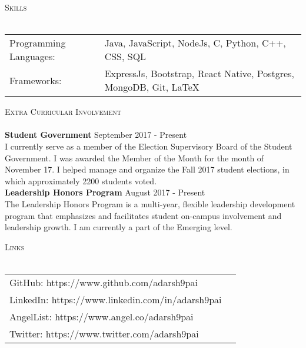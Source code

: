 \documentclass[a4paper]{article}
\newcommand{\lineunder} {
    \vspace*{-8pt} \\
    \hspace*{-18pt} \hrulefill \\
}
\newcommand{\header} [1] {
    {\hspace*{-18pt}\vspace*{6pt} \textsc{#1}}
    \vspace*{-6pt} \lineunder
}
\begin{document}
\header{Skills}
\begin{tabular}{ l l }
	Programming Languages: & Java, JavaScript, NodeJs, C, Python, C++, CSS, SQL    \\
	Frameworks:            & ExpressJs, Bootstrap, React Native, Postgres, MongoDB, Git, LaTeX \\
\end{tabular}
\vspace{2mm}


\header{Extra Curricular Involvement}
\textbf{Student Government} \hfill September 2017 - Present\\
I currently serve as a member of the Election Supervisory Board of the Student Government. I was awarded the Member of the Month for the month of November \textquotesingle{}17. I helped manage and organize the Fall 2017 student elections, in which approximately 2200 students voted.\\
\vspace*{2mm}
\textbf{Leadership Honors Program} \hfill August 2017 - Present\\
The Leadership Honors Program is a multi-year, flexible leadership development program that emphasizes and facilitates student on-campus involvement and leadership growth. I am currently a part of the Emerging level.\\
\vspace*{2mm}

\header{Links}
\vspace{2mm} 
\begin{tabular}{ l l }
    GitHub: https://www.github.com/adarsh9pai   \\
    LinkedIn: https://www.linkedin.com/in/adarsh9pai   \\
    AngelList: https://www.angel.co/adarsh9pai   \\
    Twitter: https://www.twitter.com/adarsh9pai   \\
    
	
\end{tabular}
\vspace{2mm}

\ 
\end{document}
